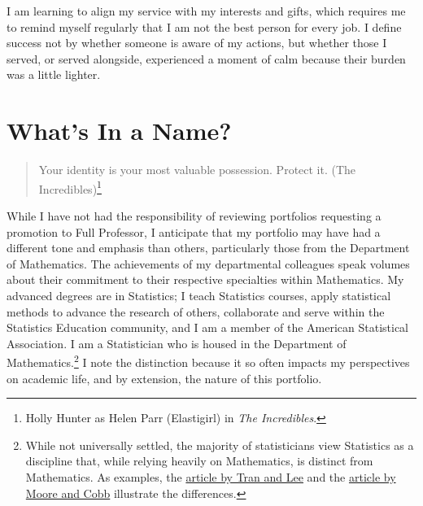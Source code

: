 \documentclass[
  letterpaper,
  DIV=11,
  numbers=noendperiod]{scrreprt}
\begin{document}
\begin{tcolorbox}[enhanced jigsaw, breakable, toptitle=1mm, arc=.35mm, leftrule=.75mm, bottomrule=.15mm, titlerule=0mm, opacitybacktitle=0.6, colbacktitle=quarto-callout-tip-color!10!white, opacityback=0, colframe=quarto-callout-tip-color-frame, toprule=.15mm, left=2mm, bottomtitle=1mm, coltitle=black, colback=white, title=\textcolor{quarto-callout-tip-color}{\faLightbulb}\hspace{0.5em}{Operating in Places that Complement My Interests and Gifts}, rightrule=.15mm]

I am learning to align my service with my interests and gifts, which
requires me to remind myself regularly that I am not the best person for
every job. I define success not by whether someone is aware of my
actions, but whether those I served, or served alongside, experienced a
moment of calm because their burden was a little lighter.

\end{tcolorbox}


\chapter{What's In a Name?}\label{whats-in-a-name}

\begin{quote}
Your identity is your most valuable possession. Protect it. (The
Incredibles)\footnote{Holly Hunter as Helen Parr (Elastigirl) in
  \emph{The Incredibles}.}
\end{quote}

While I have not had the responsibility of reviewing portfolios
requesting a promotion to Full Professor, I anticipate that my portfolio
may have had a different tone and emphasis than others, particularly
those from the Department of Mathematics. The achievements of my
departmental colleagues speak volumes about their commitment to their
respective specialties within Mathematics. My advanced degrees are in
Statistics; I teach Statistics courses, apply statistical methods to
advance the research of others, collaborate and serve within the
Statistics Education community, and I am a member of the American
Statistical Association. I am a Statistician who is housed in the
Department of Mathematics.\footnote{While not universally settled, the
  majority of statisticians view Statistics as a discipline that, while
  relying heavily on Mathematics, is distinct from Mathematics. As
  examples, the
  \href{https://fi-courses.s3.amazonaws.com/tsdi/unit_2/Essentials/Statvsmath.pdf}{article
  by Tran and Lee} and the
  \href{https://www.stat.purdue.edu/~dsmoore/articles/Statmath.pdf}{article
  by Moore and Cobb} illustrate the differences.} I note the distinction
because it so often impacts my perspectives on academic life, and by
extension, the nature of this portfolio.
\end{document}
